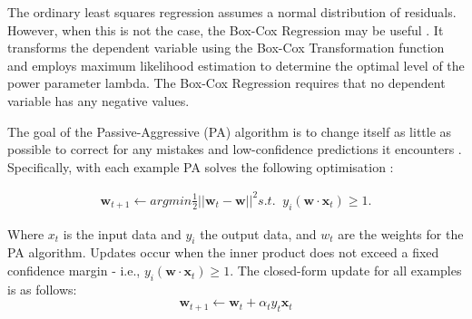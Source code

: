 \documentclass[final,3p,times,twocolumn,numbers]{elsarticle}
\begin{document}
The ordinary least squares regression assumes a normal distribution of residuals. However, when this is not the case, the Box-Cox Regression may be useful \cite{Box1964}. It transforms the dependent variable using the Box-Cox Transformation function and employs maximum likelihood estimation to determine the optimal level of the power parameter lambda. The Box-Cox Regression requires that no dependent variable has any negative values.


%
%
%
%


The goal of the Passive-Aggressive (PA) algorithm is to change itself as little as possible to correct for any mistakes and low-confidence predictions it encounters \cite{Gzik2014}. Specifically, with each example PA solves the following optimisation \cite{Ma2009}:

\begin{align}
    \boldsymbol{w}_{t+1}\leftarrow argmin \frac{1}{2}\left|\left|{\boldsymbol{w}_t-\boldsymbol{w}}\right|\right|^2 
    s.t. \; \; y_i(\boldsymbol{w}\cdot \boldsymbol{x}_t)\geq1.
\end{align}

\noindent Where $x_t$ is the input data and $y_i$ the output data, and $w_t$ are the weights for the PA algorithm. Updates occur when the inner product does not exceed a fixed confidence margin - i.e., $y_i(\boldsymbol{w}\cdot \boldsymbol{x}_t)\geq1$. The closed-form update for all examples is as follows:
\begin{equation}
    \boldsymbol{w}_{t+1}\leftarrow \boldsymbol{w}_{t} + \alpha_t y_t \boldsymbol{x}_t
\end{equation}
\end{document}
